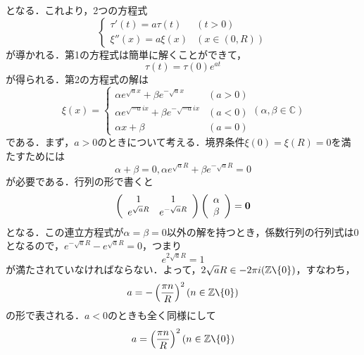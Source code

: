 \documentclass[a4j]{jsbook}
\numberwithin{theorem}{chapter}  %
\begin{document}
となる．これより，2つの方程式
\begin{equation*}
    \begin{cases}
    \tau'(t)=a\tau(t) & (t>0) \\
    \xi''(x)=a\xi(x) & (x\in(0, R))
    \end{cases}
\end{equation*}
が導かれる．第1の方程式は簡単に解くことができて，
\begin{equation*}
    \tau(t)=\tau(0)e^{at}
\end{equation*}
が得られる．第2の方程式の解は
\begin{equation*}
    \xi(x)=
    \begin{cases}
    \alpha e^{\sqrt{a}x}+\beta e^{-\sqrt{a}x} & (a>0) \\
    \alpha e^{\sqrt{-a}ix}+\beta e^{-\sqrt{-a}ix} & (a<0) \\
    \alpha x+\beta & (a=0)
    \end{cases}
    (\alpha, \beta\in\mathbb{C})
\end{equation*}
である．まず，\(a>0\)のときについて考える．境界条件\(\xi(0)=\xi(R)=0\)を満たすためには
\begin{equation*}
    \alpha+\beta=0, \alpha e^{\sqrt{a}R}+\beta e^{-\sqrt{a}R}=0
\end{equation*}
が必要である．行列の形で書くと
\begin{equation*}
    \left(
    \begin{array}{cc}
        1 & 1 \\
        e^{\sqrt{a}R} & e^{-\sqrt{a}R}
    \end{array}
    \right)
    \left(
    \begin{array}{c}
        \alpha \\
        \beta
    \end{array}
    \right)
    =\bf{0}
\end{equation*}
となる．この連立方程式が\(\alpha=\beta=0\)以外の解を持つとき，係数行列の行列式は0となるので，\(e^{-\sqrt{a}R}-e^{\sqrt{a}R}=0\)，つまり
\begin{equation*}
    e^{2\sqrt{a}R}=1
\end{equation*}
が満たされていなければならない．よって，\(2\sqrt{a}R\in -2\pi i(\mathbb{Z}\verb|\|\{0\})\)，すなわち，
\begin{equation*}
    a=-\left(\frac{\pi n}{R}\right)^2 (n\in\mathbb{Z}\verb|\|\{0\})
\end{equation*}
の形で表される．\(a<0\)のときも全く同様にして
\begin{equation*}
    a=\left(\frac{\pi n}{R}\right)^2 (n\in\mathbb{Z}\verb|\|\{0\})
\end{equation*}
\end{document}
